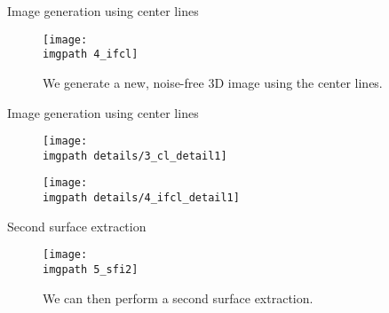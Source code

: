 
\begin{frame}{Image generation using center lines}
 \begin{center}
	\begin{figure}[H]
	\texttt{[image: \\imgpath 4\_ifcl]}
	\caption*{We generate a new, noise-free 3D image using the center lines.}
 \end{figure}
 \vfill
 \end{center}
\end{frame}


\begin{frame}{Image generation using center lines}
 \begin{center}
 \begin{figure}[H]
 	\begin{minipage}[b]{0.49\linewidth}
            	\centering
            	\texttt{[image: \\imgpath details/3\_cl\_detail1]}
		\caption*{}
	\end{minipage}
	\hfill
	\begin{minipage}[b]{0.49\linewidth}
            	\centering
            	\texttt{[image: \\imgpath details/4\_ifcl\_detail1]}
		\caption*{}
	\end{minipage}
 \end{figure}
 \end{center}
\end{frame}


\begin{frame}{Second surface extraction}
 \begin{center}
	\begin{figure}[H]
	\texttt{[image: \\imgpath 5\_sfi2]}
	\caption*{We can then perform a second surface extraction.}
 \end{figure}
 \end{center}
\end{frame}


